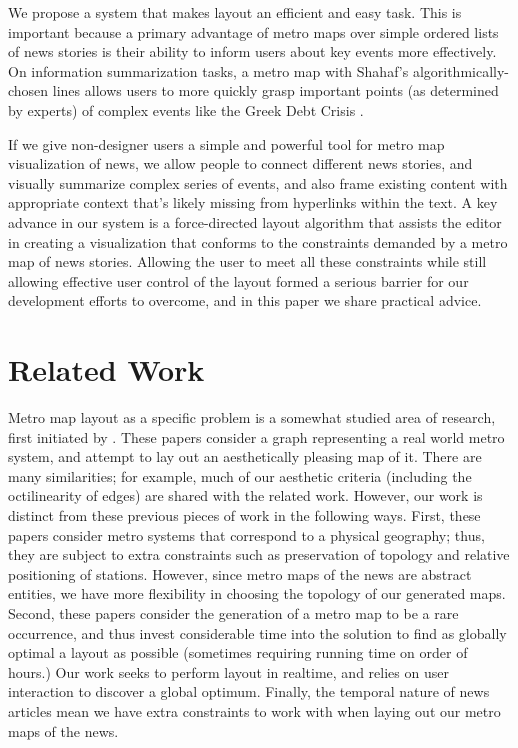 \documentclass{chi2009}
\begin{document}
We propose a system that makes layout an efficient and easy task. This is important because a primary advantage of metro maps over simple ordered lists of news stories is their ability to inform users about key events more effectively. On information summarization tasks, a metro map with Shahaf's algorithmically-chosen lines  allows users to more quickly grasp important points (as determined by experts) of complex events like the Greek Debt Crisis \cite{}.

If we give non-designer users a simple and powerful tool for metro map visualization of news, we allow people to connect different news stories, and visually summarize complex series of events, and also frame existing content with appropriate context that's likely missing from hyperlinks within the text.
A key advance in our system is a force-directed layout algorithm that assists the editor in creating a visualization that conforms to the constraints demanded by a metro map of news stories. Allowing the user to meet all these constraints while still allowing effective user control of the layout formed a serious barrier for our development efforts to overcome, and in this paper we share practical advice.

\section{Related Work}

Metro map layout as a specific problem is a somewhat studied area of research, first initiated by \cite{hong2005}. These papers consider a graph representing a real world metro system, and attempt to lay out an aesthetically pleasing map of it. \cite{nollenburg2006,stott2011} There are many similarities; for example, much of our aesthetic criteria (including the octilinearity of edges) are shared with the related work. However, our work is distinct from these previous pieces of work in the following ways. First, these papers consider metro systems that correspond to a physical geography; thus, they are subject to extra constraints such as preservation of topology and relative positioning of stations. However, since metro maps of the news are abstract entities, we have more flexibility in choosing the topology of our generated maps. Second, these papers consider the generation of a metro map to be a rare occurrence, and thus invest considerable time into the solution to find as globally optimal a layout as possible (sometimes requiring running time on order of hours.) Our work seeks to perform layout in realtime, and relies on user interaction to discover a global optimum. Finally, the temporal nature of news articles mean we have extra constraints to work with when laying out our metro maps of the news.
\end{document}
